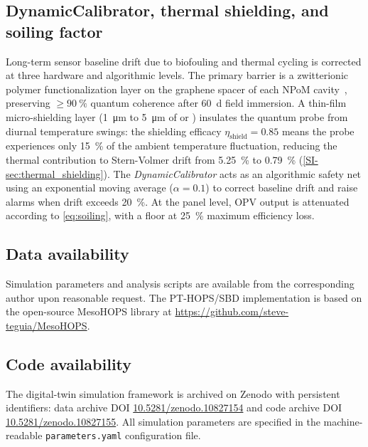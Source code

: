 \documentclass[12pt]{iopart}
\begin{document}
\subsection{DynamicCalibrator, thermal shielding, and soiling factor}

Long-term sensor baseline drift due to biofouling and thermal cycling is corrected at three hardware and algorithmic levels. The primary barrier is a zwitterionic polymer functionalization layer on the graphene spacer of each NPoM cavity~\cite{Kumar2022,Do2025}, preserving $\geq\qty{90}{\percent}$ quantum coherence after \qty{60}{\day} field immersion. A thin-film micro-shielding layer (\qty{1}{\micro\meter} to \qty{5}{\micro\meter} of  or ) insulates the quantum probe from diurnal temperature swings: the shielding efficacy $\eta_{\mathrm{shield}} = 0.85$ means the probe experiences only \qty{15}{\percent} of the ambient temperature fluctuation, reducing the thermal contribution to Stern-Volmer drift from \qty{5.25}{\percent} to \qty{0.79}{\percent} (\cref{SI-sec:thermal_shielding}). The \textit{DynamicCalibrator} acts as an algorithmic safety net using an exponential moving average ($\alpha = 0.1$) to correct baseline drift and raise alarms when drift exceeds \qty{20}{\percent}.
At the panel level, OPV output is attenuated according to \cref{eq:soiling}, with a floor at \qty{25}{\percent} maximum efficiency loss.

\subsection{Data availability}

Simulation parameters and analysis scripts are available from the corresponding author upon reasonable request.
The PT-HOPS/SBD implementation is based on the open-source MesoHOPS library at \url{https://github.com/steve-teguia/MesoHOPS}.

\subsection{Code availability}

\begin{sloppypar}
The digital-twin simulation framework is archived on Zenodo with persistent identifiers: data archive DOI \href{https://doi.org/10.5281/zenodo.10827154}{10.5281/zenodo.10827154} and code archive DOI \href{https://doi.org/10.5281/zenodo.10827155}{10.5281/zenodo.10827155}. All simulation parameters are specified in the machine-readable \texttt{parameters.yaml} configuration file.
\end{sloppypar}
\end{document}
